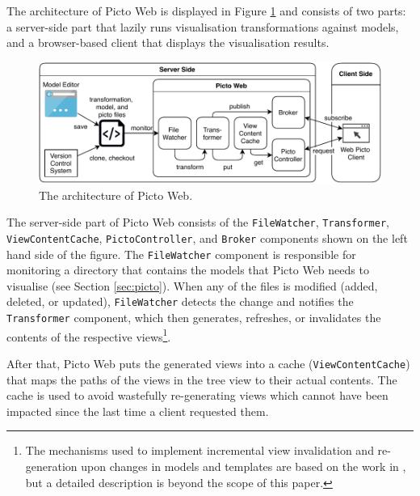 \documentclass[sigconf,review]{acmart}
\begin{document}
The architecture of Picto Web is displayed in Figure \ref{fig:architecture} and consists of two parts: a server-side part that lazily runs visualisation transformations against models, and a browser-based client that displays the visualisation results. 


\begin{figure}[h]
  \centering
  \includegraphics[width=\linewidth]{images/architecture.pdf}
  \caption{The architecture of Picto Web.}
  \label{fig:architecture}
\end{figure}

The server-side part of Picto Web consists of the \texttt{FileWatcher}, \texttt{Transformer}, \texttt{ViewContentCache}, \texttt{PictoController}, and \texttt{Broker} components shown on the left hand side of the figure. The \texttt{FileWatcher} component is responsible for monitoring a directory that contains the models that Picto Web needs to visualise (see Section \ref{sec:picto}). When any of the files is modified (added, deleted, or updated), \texttt{FileWatcher} detects the change and notifies the \texttt{Transformer} component, which then generates, refreshes, or invalidates the contents of the respective views\footnote{The mechanisms used to implement incremental view invalidation and re-generation upon changes in models and templates are based on the work in \cite{ogunyomi2019}, but a detailed description is beyond the scope of this paper.}.

After that, Picto Web puts the generated views into a cache (\texttt{ViewContentCache}) that maps the paths of the views in the tree view to their actual contents. The cache is used to avoid wastefully re-generating views which cannot have been impacted since the last time a client requested them.
\end{document}
